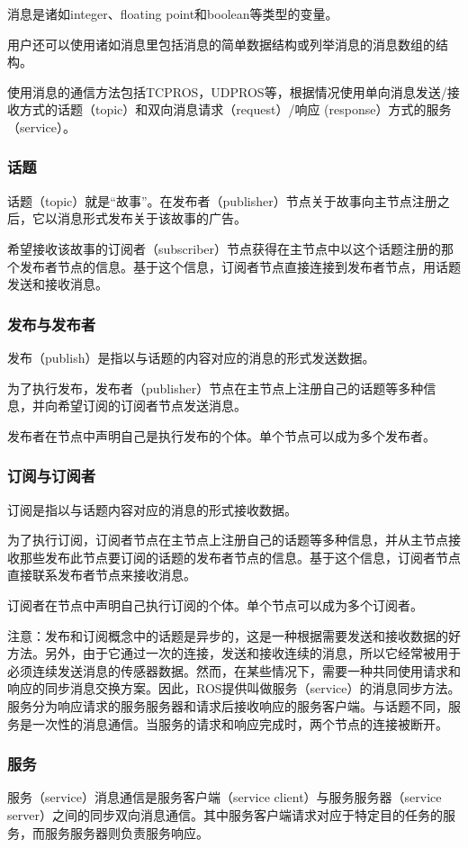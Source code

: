 \documentclass[geye,green,kindle,cn]{elegantnote}
\begin{document}
消息是诸如integer、floating point和boolean等类型的变量。

用户还可以使用诸如消息里包括消息的简单数据结构或列举消息的消息数组的结构。

使用消息的通信方法包括TCPROS，UDPROS等，根据情况使用单向消息发送/接收方式的话题（topic）和双向消息请求（request）/响应 (response）方式的服务（service）。
\subsubsection{话题}
话题（topic）就是“故事”。在发布者（publisher）节点关于故事向主节点注册之后，它以消息形式发布关于该故事的广告。

希望接收该故事的订阅者（subscriber）节点获得在主节点中以这个话题注册的那个发布者节点的信息。基于这个信息，订阅者节点直接连接到发布者节点，用话题发送和接收消息。

\subsubsection{发布与发布者}
发布（publish）是指以与话题的内容对应的消息的形式发送数据。

为了执行发布，发布者（publisher）节点在主节点上注册自己的话题等多种信息，并向希望订阅的订阅者节点发送消息。

发布者在节点中声明自己是执行发布的个体。单个节点可以成为多个发布者。
\subsubsection{订阅与订阅者}
订阅是指以与话题内容对应的消息的形式接收数据。

为了执行订阅，订阅者节点在主节点上注册自己的话题等多种信息，并从主节点接收那些发布此节点要订阅的话题的发布者节点的信息。基于这个信息，订阅者节点直接联系发布者节点来接收消息。

订阅者在节点中声明自己执行订阅的个体。单个节点可以成为多个订阅者。

注意：发布和订阅概念中的话题是异步的，这是一种根据需要发送和接收数据的好方法。另外，由于它通过一次的连接，发送和接收连续的消息，所以它经常被用于必须连续发送消息的传感器数据。然而，在某些情况下，需要一种共同使用请求和响应的同步消息交换方案。因此，ROS提供叫做服务（service）的消息同步方法。服务分为响应请求的服务服务器和请求后接收响应的服务客户端。与话题不同，服务是一次性的消息通信。当服务的请求和响应完成时，两个节点的连接被断开。

\subsubsection{服务}
服务（service）消息通信是服务客户端（service client）与服务服务器（service server）之间的同步双向消息通信。其中服务客户端请求对应于特定目的任务的服务，而服务服务器则负责服务响应。
\end{document}
